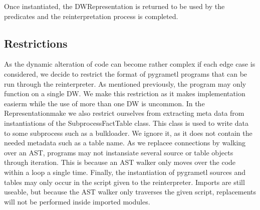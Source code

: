 Once instantiated, the DWRepresentation is returned to be used by the predicates and the reinterpretation process is completed.


\subsection{Restrictions}
As the dynamic alteration of code can become rather complex if each edge case is considered, we decide to restrict the format of pygrametl programs that can be run through the reinterpreter. As mentioned previously, the program may only function on a single DW. We make this restriction as it makes implementation easierm while the use of more than one DW is uncommon. In the Representationmake we also restrict ourselves from extracting meta data from instantiations of the SubprocessFactTable class. This class is used to write data to some subprocess such as a bulkloader. We ignore it, as it does not contain the needed metadata such as a table name. As we replacee connections by walking over an AST, programs may not instansiate several source or table objects through iteration. This is because an AST walker only moves over the code within a loop a single time. Finally, the instantiation of pygrametl sources and tables may only occur in the script given to the reinterpreter. Imports are still useable, but because the AST walker only traverses the given script, replacements will not be performed inside imported modules.   

